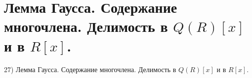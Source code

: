 \section{
 Лемма Гаусса. Содержание многочлена. Делимость в $Q(R)[x]$ и в $R[x]$.
}

27) Лемма Гаусса. Содержание многочлена. Делимость в $Q(R)[x]$ и в $R[x]$.
